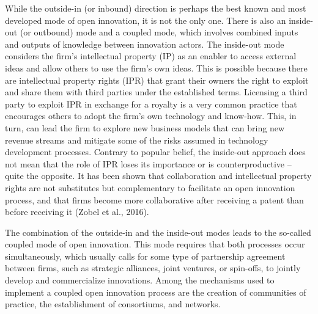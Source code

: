 \documentclass[
  letterpaper,
  DIV=11,
  numbers=noendperiod]{scrreprt}
\begin{document}
While the outside-in (or inbound) direction is perhaps the best known
and most developed mode of open innovation, it is not the only one.
There is also an inside-out (or outbound) mode and a coupled mode, which
involves combined inputs and outputs of knowledge between innovation
actors. The inside-out mode considers the firm's intellectual property
(IP) as an enabler to access external ideas and allow others to use the
firm's own ideas. This is possible because there are intellectual
property rights (IPR) that grant their owners the right to exploit and
share them with third parties under the established terms. Licensing a
third party to exploit IPR in exchange for a royalty is a very common
practice that encourages others to adopt the firm's own technology and
know-how. This, in turn, can lead the firm to explore new business
models that can bring new revenue streams and mitigate some of the risks
assumed in technology development processes. Contrary to popular belief,
the inside-out approach does not mean that the role of IPR loses its
importance or is counterproductive -- quite the opposite. It has been
shown that collaboration and intellectual property rights are not
substitutes but complementary to facilitate an open innovation process,
and that firms become more collaborative after receiving a patent than
before receiving it (Zobel et al., 2016).

The combination of the outside-in and the inside-out modes leads to the
so-called coupled mode of open innovation. This mode requires that both
processes occur simultaneously, which usually calls for some type of
partnership agreement between firms, such as strategic alliances, joint
ventures, or spin-offs, to jointly develop and commercialize
innovations. Among the mechanisms used to implement a coupled open
innovation process are the creation of communities of practice, the
establishment of consortiums, and networks.
\end{document}
